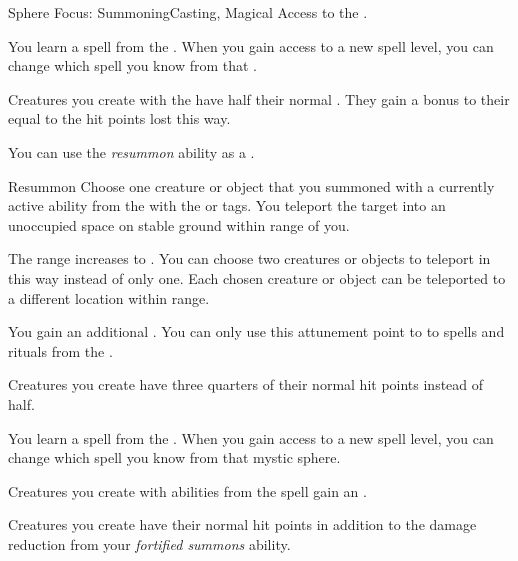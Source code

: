     \begin{feat}{Sphere Focus: Summoning}{Casting, Magical}
        \featpre Access to the  .

         You learn a spell from the  .
        When you gain access to a new spell level, you can change which spell you know from that .

         Creatures you create with the   have half their normal .
        They gain a bonus to their  equal to the hit points lost this way.

         You can use the \textit{resummon} ability as a .
        \begin{freeability}{Resummon}
            Choose one creature or object that you summoned with a currently active ability from the   with the  or  tags.
            You teleport the target into an unoccupied space on stable ground within \rngmed range of you.

            \rankline
             The range increases to \rngdist.
             You can choose two creatures or objects to teleport in this way instead of only one.
                Each chosen creature or object can be teleported to a different location within range.
        \end{freeability}

         You gain an additional .
        You can only use this attunement point to  to spells and rituals from the  .

         Creatures you create have three quarters of their normal hit points instead of half.

         You learn a spell from the  .
        When you gain access to a new spell level, you can change which spell you know from that mystic sphere.

         Creatures you create with abilities from the  spell gain an .

         Creatures you create have their normal hit points in addition to the damage reduction from your \textit{fortified summons} ability.
    \end{feat}

